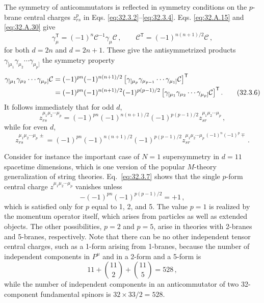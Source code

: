 The symmetry of anticommutators is reflected in symmetry conditions on
the \(p\)-brane central charges \(z_{rs}^p\) in
Eqs. \eqref{eq:32.3.2}--\eqref{eq:32.3.4}. Eqs. \eqref{eq:32.A.15} and
\eqref{eq:32.A.30} give
\begin{equation}
  \gamma_\mu^{\mathsf T}
  =(-1)^n\mathcal C^{-1}\gamma_\mu\mathcal C\,,
  \qquad
  \mathcal C^{\mathsf T}
  =(-1)^{n(n+1)/2}\mathcal C\,,
  \tag{32.3.5}\label{eq:32.3.5}
\end{equation}
for both \(d=2n\) and \(d=2n+1\). These give the antisymmetrized products
\(\gamma_{[\mu_1}\gamma_{\mu_2}\cdots\gamma_{\mu_p]}\) the symmetry
property
\begin{align}
  \gamma_{[\mu_1}\gamma_{\mu_2}\cdots\gamma_{\mu_p]}\mathcal C
  &=
  (-1)^{pn}(-1)^{n(n+1)/2}
  \left[
    \gamma_{[\mu_p}\gamma_{\mu_{p-1}}\cdots\gamma_{\mu_1]}\mathcal C
  \right]^{\mathsf T}
  \notag\\
  &=
  (-1)^{pn}(-1)^{n(n+1)/2}(-1)^{p(p-1)/2}
  \left[
    \gamma_{[\mu_1}\gamma_{\mu_2}\cdots\gamma_{\mu_p]}\mathcal C
  \right]^{\mathsf T}.
  \tag{32.3.6}\label{eq:32.3.6}
\end{align}
It follows immediately that for odd \(d\),
\begin{equation}
  z_{rs}^{\mu_1\mu_2\cdots\mu_p}
  =(-1)^{pn}(-1)^{n(n+1)/2}(-1)^{p(p-1)/2}
   z_{sr}^{\mu_1\mu_2\cdots\mu_p}\,,
  \tag{32.3.7}\label{eq:32.3.7}
\end{equation}
while for even \(d\),
\begin{equation}
  z_{rs}^{\mu_1\mu_2\cdots\mu_p\,\pm}
  =(-1)^{pn}(-1)^{n(n+1)/2}(-1)^{p(p-1)/2}
   z_{sr}^{\mu_1\mu_2\cdots\mu_p\,(-1)^n(-1)^p\mp}\,.
  \tag{32.3.8}\label{eq:32.3.8}
\end{equation}

Consider for instance the important case of \(N=1\) supersymmetry in
\(d=11\) spacetime dimensions, which is one version of the popular
\(M\)-theory generalization of string theories. Eq.~\eqref{eq:32.3.7} shows that
the single \(p\)-form central charge \(z^{\mu_1\mu_2\cdots\mu_p}\)
vanishes unless
\begin{equation}
  -(-1)^{pn}(-1)^{p(p-1)/2}=+1\,,
  \tag{32.3.9}\label{eq:32.3.9}
\end{equation}
which is satisfied only for \(p\) equal to 1, 2, and 5. The value \(p=1\)
is realized by the momentum operator itself, which arises from particles
as well as extended objects. The other possibilities, \(p=2\) and
\(p=5\), arise in theories with 2-branes and 5-branes, respectively. Note
that there can be no other independent tensor central charges, such as a
1-form arising from 1-branes, because the number of independent components
in \(P^\mu\) and in a 2-form and a 5-form is
\[
  11+\binom{11}{2}+\binom{11}{5}=528\,,
\]
while the number of independent components in an anticommutator of two
32-component fundamental spinors is \(32\times33/2=528\).

